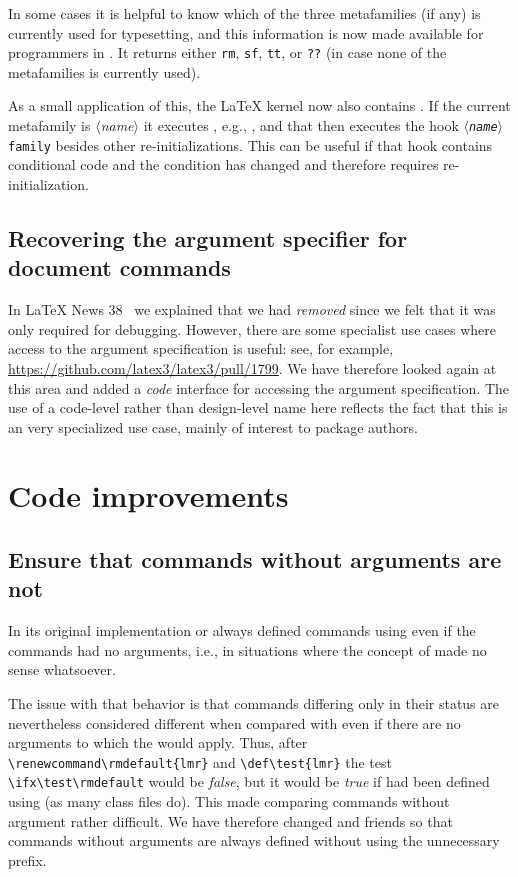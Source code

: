 \documentclass{ltnews}
\providecommand\meta[1]{$\langle$\textrm{\itshape#1}$\rangle$}
\begin{document}
In some cases it is helpful to know which of the three metafamilies
(if any) is currently used for typesetting, and this information is
now made available for programmers in . It
returns either \texttt{rm}, \texttt{sf}, \texttt{tt}, or \texttt{??}
(in case none of the metafamilies is currently used).

As a small application of this, the \LaTeX{} kernel now also contains
. If the current metafamily is \meta{name} it
executes \cs{\meta{name}family}, e.g., , and that then
executes the hook \texttt{\meta{name}family} besides other
re-initializations. This can be useful if that hook contains
conditional code and the condition has changed and therefore requires
re-initialization.

\subsection{Recovering the argument specifier for document commands}

In \LaTeX{} News 38~\cite{42:ltnews38} we explained that we had
\emph{removed}  since we felt that it
was only required for debugging. However, there are some specialist
use cases where access to the argument specification is useful: see,
for example, \url{https://github.com/latex3/latex3/pull/1799}. We have
therefore looked again at this area and added a \emph{code} interface
 for accessing the argument
specification. The use of a code-level rather than design-level name
here reflects the fact that this is an very specialized use case,
mainly of interest to package authors.

\section{Code improvements}

\subsection{Ensure that commands without arguments are not }

In its original implementation  or 
always defined commands using  even if the commands
had no arguments, i.e., in situations where the concept of 
made no sense whatsoever.

The issue with that behavior is that commands differing only in their
 status are nevertheless considered different when compared
with  even if there are no arguments to which the 
would apply. Thus, after \verb=\renewcommand\rmdefault{lmr}= and
\verb=\def\test{lmr}= the test \verb=\ifx\test\rmdefault= would be
\emph{false}, but it would be \emph{true} if  had been
defined using  (as many class files do).  This made comparing
commands without argument rather difficult.
%
We have therefore changed  and friends so that commands
without arguments are always defined without using the unnecessary
 prefix.
\end{document}
